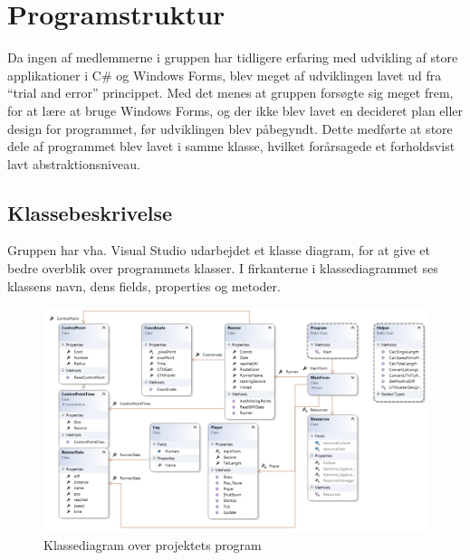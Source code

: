 \section{Programstruktur}
Da ingen af medlemmerne i gruppen har tidligere erfaring med udvikling af store applikationer i C\# og Windows Forms, blev meget af udviklingen lavet ud fra “trial and error” princippet. Med det menes at gruppen forsøgte sig meget frem, for at lære at bruge Windows Forms, og der ikke blev lavet en decideret plan eller design for programmet, før udviklingen blev påbegyndt. Dette medførte at store dele af programmet blev lavet i samme klasse, hvilket forårsagede et forholdsvist lavt abstraktionsniveau. 

\subsection{Klassebeskrivelse}
Gruppen har vha. Visual Studio udarbejdet et klasse diagram, for at give et bedre overblik over programmets klasser. I firkanterne i klassediagrammet ses klassens navn, dens fields, properties og metoder.

\begin{figure} [h]
	\centering
	\includegraphics[width=1\textwidth]{billeder/KlasseDiagram}
	\caption{Klassediagram over projektets program}
\end{figure}

